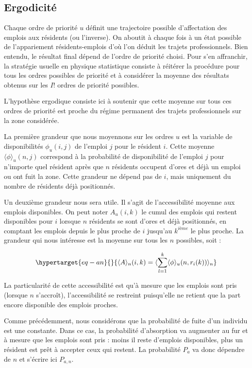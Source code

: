 \documentclass[
  10pt,
  a4paper,
  numbers=noendperiod,
  DIV=12]{scrartcl}
\begin{document}
\hypertarget{sec-erg}{%
\subsection{Ergodicité}\label{sec-erg}}

Chaque ordre de priorité \(u\) définit une trajectoire possible
d'affectation des emplois aux résidents (ou l'inverse). On aboutit à
chaque fois à un état possible de l'appariement résidents-emplois d'où
l'on déduit les trajets professionnels. Bien entendu, le résultat final
dépend de l'ordre de priorité choisi. Pour s'en affranchir, la stratégie
usuelle en physique statistique consiste à réitérer la procédure pour
tous les ordres possibles de priorité et à considérer la moyenne des
résultats obtenus sur les \(I!\) ordres de priorité possibles.

L'hypothèse ergodique consiste ici à soutenir que cette moyenne sur tous
ces ordres de priorité est proche du régime permanent des trajets
professionnels sur la zone considérée.

La première grandeur que nous moyennons sur les ordres \(u\) est la
variable de disponibilités \(\phi_u(i,j)\) de l'emploi \(j\) pour le
résident \(i\). Cette moyenne \(\langle\phi\rangle_u(n,j)\) correspond à
la probabilité de disponibilité de l'emploi \(j\) pour n'importe quel
résident après que \(n\) résidents occupent d'ores et déjà un emploi ou
ont fuit la zone. Cette grandeur ne dépend pas de \(i\), mais uniquement
du nombre de résidents déjà positionnés.

Un deuxième grandeur nous sera utile. Il s'agit de l'accessibilité
moyenne aux emplois disponibles. On peut noter \(A_u(i,k)\) le cumul des
emplois qui restent disponibles pour \(i\) lorsque \(n\) résidents se
sont d'ores et déjà positionnés, en comptant les emplois depuis le plus
proche de \(i\) jusqu'au \(k^{ième}\) le plus proche. La grandeur qui
nous intéresse est la moyenne sur tous les \(n\) possibles, soit :

\begin{equation}\protect\hypertarget{eq-an}{}{
\langle A \rangle_n(i,k) = \langle\sum_{l=1}^k \langle \phi \rangle_u(n, r_i(k)) \rangle _n
}\label{eq-an}\end{equation}

La particularité de cette accessibilité est qu'à mesure que les emplois
sont pris (lorsque \(n\) s'accroît), l'accessibilité se restreint
puisqu'elle ne retient que la part encore disponible des emplois
proches.

Comme précédemment, nous considérons que la probabilité de fuite d'un
individu est une constante. Dans ce cas, la probabilité d'absorption va
augmenter au fur et à mesure que les emplois sont pris : moins il reste
d'emplois disponibles, plus un résident est prêt à accepter ceux qui
restent. La probabilité \(P_a\) va donc dépendre de \(n\) et s'écrire
ici \(P_{a,n}\).
\end{document}
